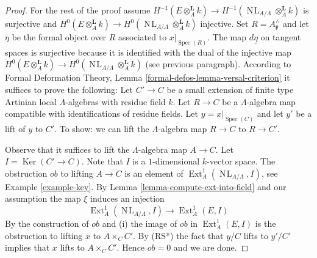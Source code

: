 \documentclass[10pt,a4paper]{amsart}
\theoremstyle{plain}
\theoremstyle{definition}
\theoremstyle{remark}
\numberwithin{equation}{subsection}
\def\Spec{\mathop{\mathrm{Spec}}}
\def\Ext{\mathop{\mathrm{Ext}}\nolimits}
\def\NL{\mathop{N\!L}\nolimits}
\def\Ker{\mathop{\mathrm{Ker}}}
\begin{document}
\begin{proof}
\medskip\noindent
For the rest of the proof assume $H^{-1}(E \otimes_A^\mathbf{L} k) \to
H^{-1}(\NL_{A/\Lambda} \otimes_A^\mathbf{L} k)$
is surjective and
$H^0(E \otimes_A^\mathbf{L} k) \to
H^0(\NL_{A/\Lambda} \otimes_A^\mathbf{L} k)$
injective. Set $R = A_\mathfrak p^\wedge$ and let $\eta$ be the
formal object over $R$ associated to $x|_{\Spec(R)}$.
The map $d\underline{\eta}$ on tangent spaces is surjective
because it is identified with the dual of the injective map
$H^0(E \otimes_A^{\mathbf{L}} k) \to
H^0(\NL_{A/\Lambda} \otimes_A^{\mathbf{L}} k)$
(see previous paragraph). According to
Formal Deformation Theory, Lemma \ref{formal-defos-lemma-versal-criterion}
it suffices to prove the following:
Let $C' \to C$ be a small extension of finite type Artinian local
$\Lambda$-algebras with residue field $k$. Let $R \to C$ be a
$\Lambda$-algebra map compatible with identifications of residue fields.
Let $y = x|_{\Spec(C)}$ and let $y'$ be a lift of $y$ to $C'$.
To show: we can lift the $\Lambda$-algebra map $R \to C$ to $R \to C'$.

\medskip\noindent
Observe that it suffices to lift the $\Lambda$-algebra map $A \to C$.
Let $I = \Ker(C' \to C)$. Note that $I$ is a $1$-dimensional $k$-vector
space. The obstruction $ob$ to lifting $A \to C$ is an element of
$\Ext^1_A(\NL_{A/\Lambda}, I)$, see Example \ref{example-key}.
By Lemma \ref{lemma-compute-ext-into-field} and our assumption the map
$\xi$ induces an injection
$$
\Ext^1_A(\NL_{A/\Lambda}, I)
\longrightarrow
\Ext^1_A(E, I)
$$
By the construction of $ob$ and (i) the image of $ob$ in $\Ext^1_A(E, I)$
is the obstruction to lifting $x$ to $A \times_C C'$. By (RS*) the fact that
$y/C$ lifts to $y'/C'$ implies that $x$ lifts to $A \times_C C'$. Hence
$ob = 0$ and we are done.
\end{proof}
\end{document}
